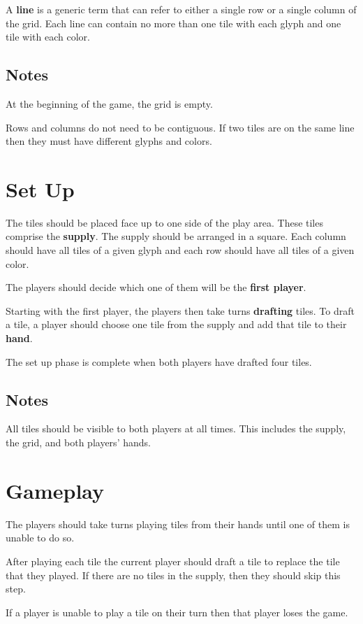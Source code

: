 \documentclass[a4paper, 10pt, notumble]{leaflet}
\begin{document}
A \textbf{line} is a generic term that can refer to either a single row or a single column of the grid. Each line can contain no more than one tile with each glyph and one tile with each color.

\subsection{Notes}
At the beginning of the game, the grid is empty.

Rows and columns do not need to be contiguous.
If two tiles are on the same line then they must have different glyphs and colors.

\section{Set Up}
The tiles should be placed face up to one side of the play area. These tiles comprise the \textbf{supply}. The supply should be arranged in a square. Each column should have all tiles of a given glyph and each row should have all tiles of a given color.

The players should decide which one of them will be the \textbf{first player}.

Starting with the first player, the players then take turns \textbf{drafting} tiles. To draft a tile, a player should choose one tile from the supply and add that tile to their \textbf{hand}.

The set up phase is complete when both players have drafted four tiles.

\subsection{Notes}
All tiles should be visible to both players at all times.  This includes the supply, the grid, and both players' hands.

\newpage

\section{Gameplay}
The players should take turns playing tiles from their hands until one of them is unable to do so.

After playing each tile the current player should draft a tile to replace the tile that they played. If there are no tiles in the supply, then they should skip this step.

If a player is unable to play a tile on their turn then that player loses the game.
\end{document}
